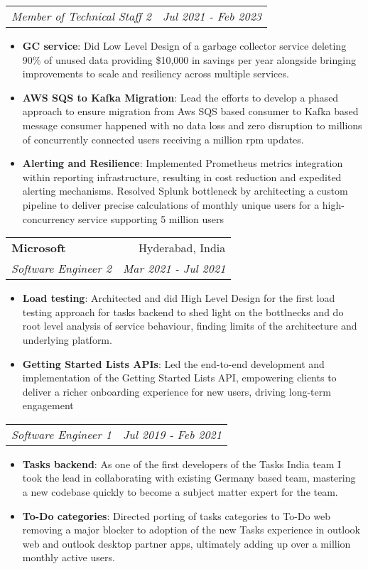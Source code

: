 \documentclass[letterpaper,11pt]{article}
\makeatletter
\newcommand{\resumeItem}[2]{
  \item\small{
    \textbf{#1}{: #2 \vspace{-2pt}}
  }
}
\newcommand{\resumeSubheading}[4]{
  \vspace{-1pt}\item
    \begin{tabular*}{0.97\textwidth}[t]{l@{\extracolsep{\fill}}r}
      \textbf{#1} & #2 \\
      \textit{\small#3} & \textit{\small #4} \\
    \end{tabular*}\vspace{-5pt}
}
\newcommand{\resumeSubSubheading}[2]{
    \begin{tabular*}{0.97\textwidth}{l@{\extracolsep{\fill}}r}
      \textit{\small#1} & \textit{\small #2} \\
    \end{tabular*}\vspace{-5pt}
}
\newcommand{\resumeItemListStart}{\begin{itemize}}
\newcommand{\resumeItemListEnd}{\end{itemize}\vspace{-5pt}}
\makeatother
\begin{document}
    \resumeSubSubheading
    {Member of Technical Staff 2}{Jul 2021 - Feb 2023}
      \resumeItemListStart
        \resumeItem{GC service}
          {Did Low Level Design of a garbage collector service deleting 90\% of unused data providing \$10,000 in savings per year alongside bringing improvements to scale and resiliency across multiple services.}
		    \resumeItem{AWS SQS to Kafka Migration}
          {Lead the efforts to develop a phased approach to ensure migration from Aws SQS based consumer to Kafka based message consumer happened with no data loss and zero disruption to millions of concurrently connected users receiving a million rpm updates.}
        \resumeItem{Alerting and Resilience}
          {Implemented Prometheus metrics integration within reporting infrastructure, resulting in cost reduction and expedited alerting mechanisms. Resolved Splunk bottleneck by architecting a custom pipeline to deliver precise calculations of monthly unique users for a high-concurrency service supporting 5 million users }
     \resumeItemListEnd


    \resumeSubheading
      {Microsoft}{Hyderabad, India}
      {Software Engineer 2}{Mar 2021 - Jul 2021}
      \resumeItemListStart
        \resumeItem{Load testing}
          {Architected and did High Level Design for the first load testing approach for tasks backend to shed light on the bottlnecks and do root level analysis of service behaviour, finding limits of the architecture and underlying platform.}
        \resumeItem{Getting Started Lists APIs}
          {Led the end-to-end development and implementation of the Getting Started Lists API, empowering clients to deliver a richer onboarding experience for new users, driving long-term engagement}
      \resumeItemListEnd

	  \resumeSubSubheading
		{Software Engineer 1}{Jul 2019 - Feb 2021}
		\resumeItemListStart
			\resumeItem{Tasks backend}
			{As one of the first developers of the Tasks India team I took the lead in collaborating with existing Germany based team, mastering a new codebase quickly to become a subject matter expert for the team.}
			\resumeItem{To-Do categories}
			{Directed porting of tasks categories to To-Do web removing a major blocker to adoption of the new Tasks experience in outlook web and outlook desktop partner apps, ultimately adding up over a million monthly active users.}
		\resumeItemListEnd
\end{document}
